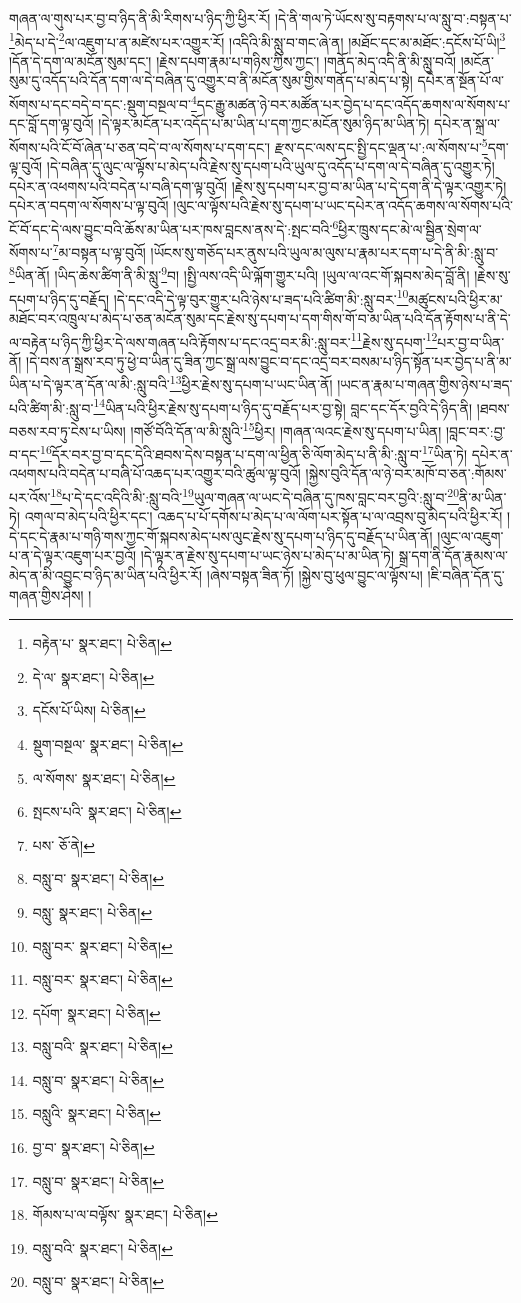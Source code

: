 གཞན་ལ་གུས་པར་བྱ་བ་ཉིད་ནི་མི་རིགས་པ་ཉིད་ཀྱི་ཕྱིར་རོ། །དེ་ནི་གལ་ཏེ་ཡོངས་སུ་བརྟགས་པ་ལ་སླུ་བ་:བསྟན་པ་\footnote{བརྟེན་པ་  སྣར་ཐང་།  པེ་ཅིན། }མེད་པ་དེ་\footnote{དེ་ལ་  སྣར་ཐང་།  པེ་ཅིན། }ལ་འཇུག་པ་ན་མཛེས་པར་འགྱུར་རོ། །འདིའི་མི་སླུ་བ་གང་ཞེ་ན། །མཐོང་དང་མ་མཐོང་:དངོས་པོ་ཡི།\footnote{དངོས་པོ་ཡིས།  པེ་ཅིན། } །དོན་དེ་དག་ལ་མངོན་སུམ་དང་། །རྗེས་དཔག་རྣམ་པ་གཉིས་ཀྱིས་ཀྱང་། །གནོད་མེད་འདི་ནི་མི་སླུ་བའོ། །མངོན་སུམ་དུ་འདོད་པའི་དོན་དག་ལ་དེ་བཞིན་དུ་འགྱུར་བ་ནི་མངོན་སུམ་གྱིས་གནོད་པ་མེད་པ་སྟེ། དཔེར་ན་སྔོན་པོ་ལ་སོགས་པ་དང་བདེ་བ་དང་:སྡུག་བསྔལ་བ་\footnote{སྡུག་བསྔལ་  སྣར་ཐང་།  པེ་ཅིན། }དང་རྒྱུ་མཚན་ཉེ་བར་མཚོན་པར་བྱེད་པ་དང་འདོད་ཆགས་ལ་སོགས་པ་དང་བློ་དག་ལྟ་བུའོ། །དེ་ལྟར་མངོན་པར་འདོད་པ་མ་ཡིན་པ་དག་ཀྱང་མངོན་སུམ་ཉིད་མ་ཡིན་ཏེ། དཔེར་ན་སྐྲ་ལ་སོགས་པའི་ངོ་བོ་ཞེན་པ་ཅན་བདེ་བ་ལ་སོགས་པ་དག་དང་། རྫས་དང་ལས་དང་སྤྱི་དང་ལྡན་པ་:ལ་སོགས་པ་\footnote{ལ་སོགས་  སྣར་ཐང་།  པེ་ཅིན། }དག་ལྟ་བུའོ། །དེ་བཞིན་དུ་ལུང་ལ་ལྟོས་པ་མེད་པའི་རྗེས་སུ་དཔག་པའི་ཡུལ་དུ་འདོད་པ་དག་ལ་དེ་བཞིན་དུ་འགྱུར་ཏེ། དཔེར་ན་འཕགས་པའི་བདེན་པ་བཞི་དག་ལྟ་བུའོ། །རྗེས་སུ་དཔག་པར་བྱ་བ་མ་ཡིན་པ་དེ་དག་ནི་དེ་ལྟར་འགྱུར་ཏེ། དཔེར་ན་བདག་ལ་སོགས་པ་ལྟ་བུའོ། །ལུང་ལ་ལྟོས་པའི་རྗེས་སུ་དཔག་པ་ཡང་དཔེར་ན་འདོད་ཆགས་ལ་སོགས་པའི་ངོ་བོ་དང་དེ་ལས་བྱུང་བའི་ཆོས་མ་ཡིན་པར་ཁས་བླངས་ནས་དེ་:སྤང་བའི་\footnote{སྤངས་པའི་  སྣར་ཐང་།  པེ་ཅིན། }ཕྱིར་ཁྲུས་དང་མེ་ལ་སྦྱིན་སྲེག་ལ་སོགས་པ་\footnote{པས་  ཅོ་ནེ། }མ་བསྟན་པ་ལྟ་བུའོ། །ཡོངས་སུ་གཅོད་པར་ནུས་པའི་ཡུལ་མ་ལུས་པ་རྣམ་པར་དག་པ་དེ་ནི་མི་:སླུ་བ་\footnote{བསླུ་བ་  སྣར་ཐང་།  པེ་ཅིན། }ཡིན་ནོ། །ཡིད་ཆེས་ཚིག་ནི་མི་སླུ་\footnote{བསླུ་  སྣར་ཐང་།  པེ་ཅིན། }བ། །སྤྱི་ལས་འདི་ཡི་ལྐོག་གྱུར་པའི། །ཡུལ་ལ་འང་གོ་སྐབས་མེད་བློ་ནི། །རྗེས་སུ་དཔག་པ་ཉིད་དུ་བརྗོད། །དེ་དང་འདི་དེ་ལྟ་བུར་གྱུར་པའི་ཉེས་པ་ཟད་པའི་ཚིག་མི་:སླུ་བར་\footnote{བསླུ་བར་  སྣར་ཐང་།  པེ་ཅིན། }མཚུངས་པའི་ཕྱིར་མ་མཐོང་བར་འཁྲུལ་པ་མེད་པ་ཅན་མངོན་སུམ་དང་རྗེས་སུ་དཔག་པ་དག་གིས་གོ་བ་མ་ཡིན་པའི་དོན་རྟོགས་པ་ནི་དེ་ལ་བརྟེན་པ་ཉིད་ཀྱི་ཕྱིར་དེ་ལས་གཞན་པའི་རྟོགས་པ་དང་འདྲ་བར་མི་:སླུ་བར་\footnote{བསླུ་བར་  སྣར་ཐང་།  པེ་ཅིན། }རྗེས་སུ་དཔག་\footnote{དཔོག་  སྣར་ཐང་།  པེ་ཅིན། }པར་བྱ་བ་ཡིན་ནོ། །དེ་བས་ན་སྒྲས་རབ་ཏུ་ཕྱེ་བ་ཡིན་དུ་ཟིན་ཀྱང་སྒྲ་ལས་བྱུང་བ་དང་འདྲ་བར་བསམ་པ་ཉིད་སྟོན་པར་བྱེད་པ་ནི་མ་ཡིན་པ་དེ་ལྟར་ན་དོན་ལ་མི་:སླུ་བའི་\footnote{བསླུ་བའི་  སྣར་ཐང་།  པེ་ཅིན། }ཕྱིར་རྗེས་སུ་དཔག་པ་ཡང་ཡིན་ནོ། །ཡང་ན་རྣམ་པ་གཞན་གྱིས་ཉེས་པ་ཟད་པའི་ཚིག་མི་:སླུ་བ་\footnote{བསླུ་བ་  སྣར་ཐང་།  པེ་ཅིན། }ཡིན་པའི་ཕྱིར་རྗེས་སུ་དཔག་པ་ཉིད་དུ་བརྗོད་པར་བྱ་སྟེ། བླང་དང་དོར་བྱའི་དེ་ཉིད་ནི། །ཐབས་བཅས་རབ་ཏུ་ངེས་པ་ཡིས། །གཙོ་བོའི་དོན་ལ་མི་སླུའི་\footnote{བསླུའི་  སྣར་ཐང་།  པེ་ཅིན། }ཕྱིར། །གཞན་ལའང་རྗེས་སུ་དཔག་པ་ཡིན། །བླང་བར་:བྱ་བ་དང་\footnote{བྱ་བ་  སྣར་ཐང་།  པེ་ཅིན། }དོར་བར་བྱ་བ་དང་དེའི་ཐབས་དེས་བསྟན་པ་དག་ལ་ཕྱིན་ཅི་ལོག་མེད་པ་ནི་མི་:སླུ་བ་\footnote{བསླུ་བ་  སྣར་ཐང་།  པེ་ཅིན། }ཡིན་ཏེ། དཔེར་ན་འཕགས་པའི་བདེན་པ་བཞི་པོ་འཆད་པར་འགྱུར་བའི་ཚུལ་ལྟ་བུའོ། །སྐྱེས་བུའི་དོན་ལ་ཉེ་བར་མཁོ་བ་ཅན་:གོམས་པར་འོས་\footnote{གོམས་པ་ལ་བལྟོས་  སྣར་ཐང་།  པེ་ཅིན། }པ་དེ་དང་འདིའི་མི་:སླུ་བའི་\footnote{བསླུ་བའི་  སྣར་ཐང་།  པེ་ཅིན། }ཡུལ་གཞན་ལ་ཡང་དེ་བཞིན་དུ་ཁས་བླང་བར་བྱའི་:སླུ་བ་\footnote{བསླུ་བ་  སྣར་ཐང་།  པེ་ཅིན། }ནི་མ་ཡིན་ཏེ། འགལ་བ་མེད་པའི་ཕྱིར་དང་། འཆད་པ་པོ་དགོས་པ་མེད་པ་ལ་ལོག་པར་སྟོན་པ་ལ་འབྲས་བུ་མེད་པའི་ཕྱིར་རོ། །དེ་དང་དེ་རྣམ་པ་གཉི་གས་ཀྱང་གོ་སྐབས་མེད་པས་ལུང་རྗེས་སུ་དཔག་པ་ཉིད་དུ་བརྗོད་པ་ཡིན་ནོ། །ལུང་ལ་འཇུག་པ་ན་དེ་ལྟར་འཇུག་པར་བྱའོ། །དེ་ལྟར་ན་རྗེས་སུ་དཔག་པ་ཡང་ཉེས་པ་མེད་པ་མ་ཡིན་ཏེ། སྒྲ་དག་ནི་དོན་རྣམས་ལ་མེད་ན་མི་འབྱུང་བ་ཉིད་མ་ཡིན་པའི་ཕྱིར་རོ། །ཞེས་བསྟན་ཟིན་ཏོ། །སྐྱེས་བུ་ཕུལ་བྱུང་ལ་ལྟོས་པ། །ཇི་བཞིན་དོན་དུ་གཞན་གྱིས་ཤེས། །
